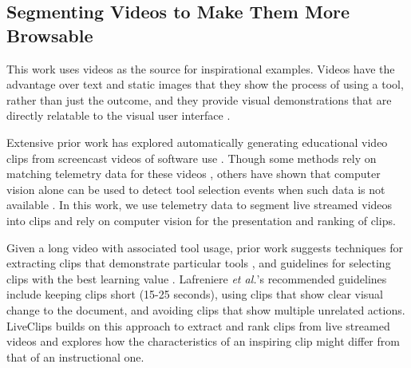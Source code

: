 \subsection{Segmenting Videos to Make Them More Browsable}
This work uses videos as the source for inspirational examples. Videos have the advantage over text and static images that they show the process of using a tool, rather than just the outcome, and they provide visual demonstrations that are directly relatable to the visual user interface \cite{Grossman2010a}.

Extensive prior work has explored automatically generating educational video clips from screencast videos of software use \cite{Pongnumkul2011, Chi2012, Banovic2012, Lafreniere2014, Nguyen2015}. Though some methods rely on matching telemetry data for these videos \cite{Grossman2010, Lafreniere2014, Chi2012}, others have shown that computer vision alone can be used to detect tool selection events when such data is not available \cite{Pongnumkul2011, Banovic2012}. In this work, we use telemetry data to segment live streamed videos into clips and rely on computer vision for the presentation and ranking of clips. 

Given a long video with associated tool usage, prior work suggests techniques for extracting clips that demonstrate particular tools \cite{Pongnumkul2011, Chi2012, Lafreniere2014}, and guidelines for selecting clips with the best learning value \cite{Lafreniere2014}. Lafreniere \textit{et al.}'s recommended guidelines \cite{Lafreniere2014} include keeping clips short (15-25 seconds), using clips that show clear visual change to the document, and avoiding clips that show multiple unrelated actions. LiveClips builds on this approach to extract and rank clips from live streamed videos and explores how the characteristics of an inspiring clip might differ from that of an instructional one.
